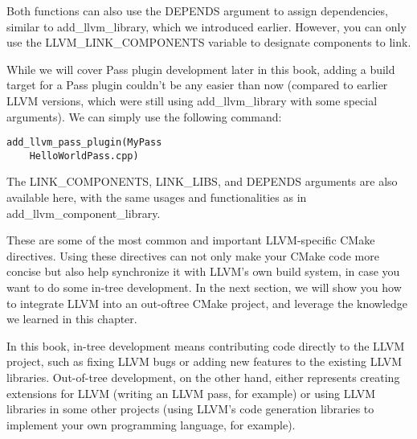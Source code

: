 Both functions can also use the DEPENDS argument to assign dependencies, similar to add\_llvm\_library, which we introduced earlier. However, you can only use the LLVM\_LINK\_COMPONENTS variable to designate components to link.


While we will cover Pass plugin development later in this book, adding a build target for a Pass plugin couldn't be any easier than now (compared to earlier LLVM versions, which were still using add\_llvm\_library with some special arguments). We can simply use the following command:

\begin{lstlisting}[style=styleCMake]
add_llvm_pass_plugin(MyPass
	HelloWorldPass.cpp)
\end{lstlisting}

The LINK\_COMPONENTS, LINK\_LIBS, and DEPENDS arguments are also available here, with the same usages and functionalities as in add\_llvm\_component\_library.

These are some of the most common and important LLVM-specific CMake directives. Using these directives can not only make your CMake code more concise but also help synchronize it with LLVM's own build system, in case you want to do some in-tree development. In the next section, we will show you how to integrate LLVM into an out-oftree CMake project, and leverage the knowledge we learned in this chapter.

\begin{tcolorbox}[colback=blue!5!white,colframe=blue!75!black, fonttitle=\bfseries,title=In-tree versus out-of-tree development]
\hspace*{0.7cm}In this book, in-tree development means contributing code directly to the LLVM project, such as fixing LLVM bugs or adding new features to the existing LLVM libraries. Out-of-tree development, on the other hand, either represents creating extensions for LLVM (writing an LLVM pass, for example) or using LLVM libraries in some other projects (using LLVM's code generation libraries to implement your own programming language, for example).
\end{tcolorbox}














